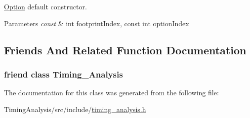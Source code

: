 \hyperlink{classTiming__Analysis_1_1Option}{Option} default constructor. 


\begin{DoxyParams}{Parameters}
{\em const} & int footprint\-Index, const int option\-Index \\
\hline
\end{DoxyParams}


\subsection{Friends And Related Function Documentation}
\hypertarget{classTiming__Analysis_1_1Option_aab560f9cdcd55852a6a08a29a54a2b16}{
\subsubsection[{Timing\-\_\-\-Analysis}]{\setlength{\rightskip}{0pt plus 5cm}friend class {\bf Timing\-\_\-\-Analysis}\hspace{0.3cm}{\ttfamily [friend]}}}\label{classTiming__Analysis_1_1Option_aab560f9cdcd55852a6a08a29a54a2b16}


The documentation for this class was generated from the following file\-:\begin{DoxyCompactItemize}
\item 
Timing\-Analysis/src/include/\hyperlink{timing__analysis_8h}{timing\-\_\-analysis.\-h}\end{DoxyCompactItemize}
